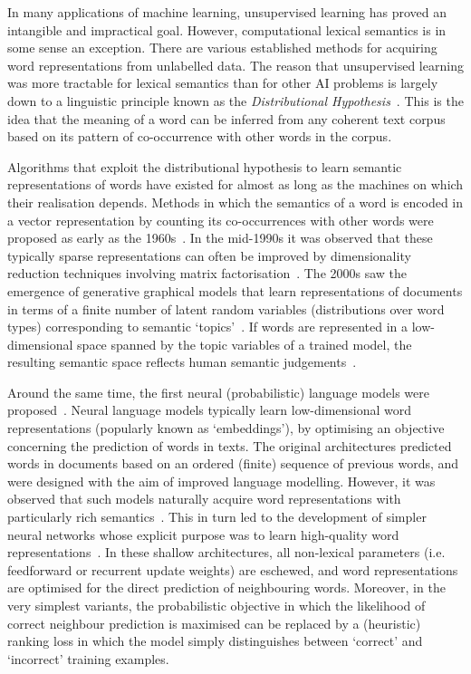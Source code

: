 \label{CH2}

In many applications of machine learning, unsupervised learning has proved an intangible and impractical goal. However, computational lexical semantics is in some sense an exception. There are various established methods for acquiring word representations from unlabelled data. The reason that unsupervised learning was more tractable for lexical semantics than for other AI problems is largely down to a linguistic principle known as the \emph{Distributional Hypothesis}~\citep{dist}. This is the idea that the meaning of a word can be inferred from any coherent text corpus based on its pattern of co-occurrence with other words in the corpus. 

Algorithms that exploit the distributional hypothesis to learn semantic representations of words have existed for almost as long as the machines on which their realisation depends. Methods in which the semantics of a word is encoded in a vector representation by counting its co-occurrences with other words were proposed as early as the 1960s~\citep{cordier1965,harper1965}. In the mid-1990s it was observed that these typically sparse representations can often be improved by dimensionality reduction techniques involving matrix factorisation~\citep{landauer1997solution}. The 2000s saw the emergence of generative graphical models that learn representations of documents in terms of a finite number of latent random variables (distributions over word types) corresponding to semantic `topics'~\citep{blei2003latent}. If words are represented in a low-dimensional space spanned by the topic variables of a trained model, the resulting semantic space reflects human semantic judgements~\citep{griffiths2007topics}. 

Around the same time, the first neural (probabilistic) language models were proposed~\citep{bengio2003neural}. Neural language models typically learn low-dimensional word representations (popularly known as `embeddings'), by optimising an objective concerning the prediction of words in texts. The original architectures predicted words in documents based on an ordered (finite) sequence of previous words, and were designed with the aim of improved language modelling. However, it was observed that such models naturally acquire word representations with particularly rich semantics~\citep{collobert2008unified}. This in turn led to the development of simpler neural networks whose explicit purpose was to learn high-quality word representations~\citep{mikolov2013efficient}. In these shallow architectures, all non-lexical parameters (i.e. feedforward or recurrent update weights) are eschewed, and word representations are optimised for the direct prediction of neighbouring words. Moreover, in the very simplest variants, the probabilistic objective in which the likelihood of correct neighbour prediction is maximised can be replaced by a (heuristic) ranking loss in which the model simply distinguishes between `correct' and `incorrect' training examples. 

